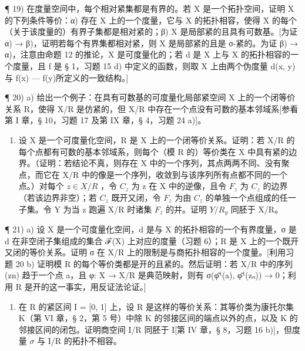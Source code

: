 ¶ 19) 在度量空间中，每个相对紧集都是有界的。若 X 是一个拓扑空间，证明 X 的下列条件等价：α) 存在 X 上的一个度量，它与 X 的拓扑相容，使得 X 的每个（关于该度量的）有界子集都是相对紧的；β) X 是局部紧的且具有可数基。{[}为证 α) → β)，证明若每个有界集都相对紧，则 X 是局部紧的且是 σ-紧的。为证 β) → α)，注意由命题 12 的推论，X 是可度量化的；若 d 是 X 上与 X 的拓扑相容的一个度量，且 f 是 § 1，习题 15 d) 中定义的函数，则取 X 上由两个伪度量 d(x, y) 与 \textbar f(x) --- f(y)\textbar 所定义的一致结构。{]}

¶ 20) a) 给出一个例子：在具有可数基的可度量化局部紧空间 X 上的一个闭等价关系 R，使得 X/R 是仿紧的，但 X/R 中存在一个点没有可数的基本邻域系{[}参看第 I 章，§ 10，习题 17 及第 IX 章，§ 4，习题 24 a){]}。

\begin{enumerate}
\def\labelenumi{\alph{enumi})}
\setcounter{enumi}{1}
\tightlist
\item
  设 X 是一个可度量化空间，R 是 X 上的一个闭等价关系。证明：若 X/R 的每个点都有可数的基本邻域系，则每个（模 R 的）等价类在 X 中具有紧的边界。（证明：若结论不真，则存在 X 中的一个序列，其点两两不同、没有聚点，而它在 X/R 中的像是一个序列，收敛到与该序列所有点都不同的一个点。）对每个 \(z \in X/R\) ，令 \(C_{z}\) 为 z 在 X 中的逆像，且令 \(F_{z}\) 为 \(C_{z}\) 的边界（若该边界非空）；若 \(C_{z}\) 既开又闭，令 \(F_{z}\) 为由 \(C_{z}\) 的单独一个点组成的任一子集。令 Y 为当 z 跑遍 X/R 时诸集 \(F_{z}\) 的并。证明 \(Y/R_{y}\) 同胚于 X/R。
\end{enumerate}

¶ 21) a) 设 X 是一个可度量化空间，d 是与 X 的拓扑相容的一个有界度量，σ 是 d 在非空闭子集组成的集合 ℱ(X) 上对应的度量（习题 6）；R 是 X 上的一个既开又闭的等价关系。证明 σ 在 X/R 上的限制是与商拓扑相容的一个度量。{[}利用习题 20 b) 证明模 R 的每个等价类都是开的且紧的。然后证明：若 X/R 中的序列 (zn) 趋于一个点 a，且 φ: X → X/R 是典范映射，则有 σ(φ̄¹(a), φ̄¹(zₙ)) → 0；利用 R 是开的这一事实，用反证法论证。{]}

\begin{enumerate}
\def\labelenumi{\alph{enumi})}
\setcounter{enumi}{1}
\tightlist
\item
  在 R 的紧区间 I = {[}0, 1{]} 上，设 R 是这样的等价关系：其等价类为康托尔集 K（第 VI 章，§ 2，第 5 号）中除 K 的邻接区间的端点以外的点，以及 K 的邻接区间的闭包。证明商空间 I/R 同胚于 I{[}第 IV 章，§ 8，习题 16 b){]}，但度量 \(\sigma\) 与 I/R 的拓扑不相容。
\end{enumerate}

